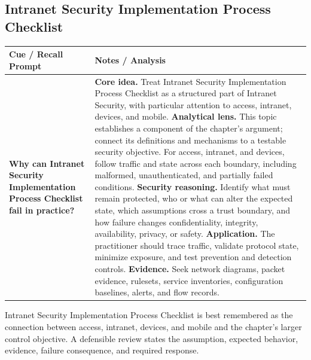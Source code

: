\documentclass[11pt]{article}
\newcommand{\CornellHeader}{%
\rowcolor{Navy}\color{white}\bfseries Cue / Recall Prompt & \color{white}\bfseries Notes / Analysis\\\hline}
\newcommand{\CornellRow}[2]{%
\cellcolor{CueGray}\RaggedRight\textbf{#1} & \RaggedRight #2\\\hline}
\begin{document}
\subsection*{Intranet Security Implementation Process Checklist}
\begin{longtable}{>{\RaggedRight\arraybackslash}p{}|>{\RaggedRight\arraybackslash}p{}}
\CornellHeader
\CornellRow{Why can Intranet Security Implementation Process Checklist fail in practice?}{\textbf{Core idea.} Treat Intranet Security Implementation Process Checklist as a structured part of Intranet Security, with particular attention to access, intranet, devices, and mobile. \textbf{Analytical lens.} This topic establishes a component of the chapter's argument; connect its definitions and mechanisms to a testable security objective. For access, intranet, and devices, follow traffic and state across each boundary, including malformed, unauthenticated, and partially failed conditions. \textbf{Security reasoning.} Identify what must remain protected, who or what can alter the expected state, which assumptions cross a trust boundary, and how failure changes confidentiality, integrity, availability, privacy, or safety. \textbf{Application.} The practitioner should trace traffic, validate protocol state, minimize exposure, and test prevention and detection controls. \textbf{Evidence.} Seek network diagrams, packet evidence, rulesets, service inventories, configuration baselines, alerts, and flow records.}
\end{longtable}
\begin{topicsummary}
Intranet Security Implementation Process Checklist is best remembered as the connection between access, intranet, devices, and mobile and the chapter's larger control objective. A defensible review states the assumption, expected behavior, evidence, failure consequence, and required response.
\end{topicsummary}
\end{document}
